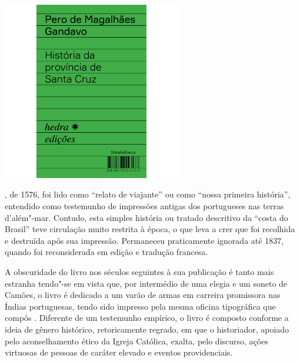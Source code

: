 \pagebreak

\begin{center}
\hspace*{-3.5cm}
\hspace*{3cm}\includegraphics[width=78mm]{./grid/gandavo.jpg}
\end{center}

\hspace*{-7cm}\hrulefill\hspace*{-7cm}

\medskip

, de 1576, foi lido como “relato de viajante” ou como “nossa primeira história”, entendido como testemunho de impressões antigas dos portugueses nas terras d’além"-mar. Contudo, esta simples história ou tratado descritivo da “costa do Brasil” teve circulação muito restrita à época, o que leva a crer que foi recolhida e destruída após sua impressão. Permaneceu praticamente ignorada até 1837, quando foi reconsiderada em edição e tradução francesa.

A obscuridade do livro nos séculos seguintes à sua publicação é tanto mais estranha tendo"-se em vista que, por intermédio de uma elegia e um soneto de Camões, o livro é dedicado a um varão de armas em carreira promissora nas Índias portuguesas, tendo sido impresso pela mesma oficina tipográfica que compôs {}. Diferente de um testemunho empírico, o livro é composto conforme a ideia de gênero histórico, retoricamente regrado, em que o historiador, apoiado pelo aconselhamento ético da Igreja Católica, exalta, pelo discurso, ações virtuosas de pessoas de caráter elevado e eventos providenciais.

\vfill

